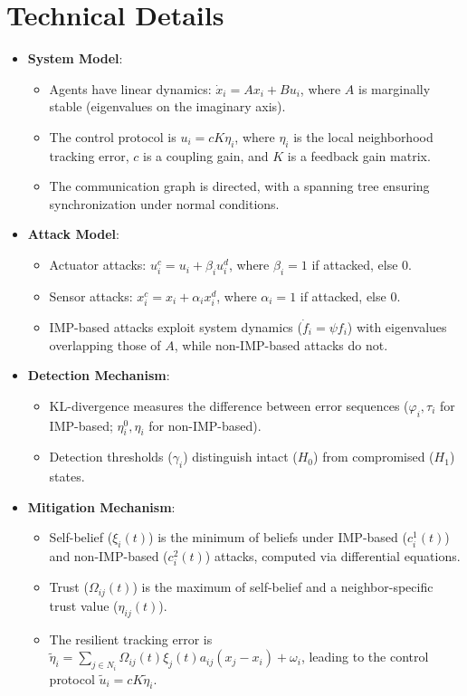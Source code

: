 \documentclass{article}
\begin{document}
\section*{Technical Details}
\begin{itemize}
    \item \textbf{System Model}:
    \begin{itemize}
        \item Agents have linear dynamics: $\dot{x}_i = A x_i + B u_i$, where $A$ is marginally stable (eigenvalues on the imaginary axis).
        \item The control protocol is $u_i = c K \eta_i$, where $\eta_i$ is the local neighborhood tracking error, $c$ is a coupling gain, and $K$ is a feedback gain matrix.
        \item The communication graph is directed, with a spanning tree ensuring synchronization under normal conditions.
    \end{itemize}

    \item \textbf{Attack Model}:
    \begin{itemize}
        \item Actuator attacks: $u_i^c = u_i + \beta_i u_i^d$, where $\beta_i = 1$ if attacked, else 0.
        \item Sensor attacks: $x_i^c = x_i + \alpha_i x_i^d$, where $\alpha_i = 1$ if attacked, else 0.
        \item IMP-based attacks exploit system dynamics ($\dot{f}_i = \psi f_i$) with eigenvalues overlapping those of $A$, while non-IMP-based attacks do not.
    \end{itemize}

    \item \textbf{Detection Mechanism}:
    \begin{itemize}
        \item KL-divergence measures the difference between error sequences ($\varphi_i, \tau_i$ for IMP-based; $\eta_i^0, \eta_i$ for non-IMP-based).
        \item Detection thresholds ($\gamma_i$) distinguish intact ($H_0$) from compromised ($H_1$) states.
    \end{itemize}

    \item \textbf{Mitigation Mechanism}:
    \begin{itemize}
        \item Self-belief ($\xi_i(t)$) is the minimum of beliefs under IMP-based ($c_i^1(t)$) and non-IMP-based ($c_i^2(t)$) attacks, computed via differential equations.
        \item Trust ($\Omega_{ij}(t)$) is the maximum of self-belief and a neighbor-specific trust value ($\eta_{ij}(t)$).
        \item The resilient tracking error is $\tilde{\eta}_i = \sum_{j \in N_i} \Omega_{ij}(t) \xi_j(t) a_{ij} (x_j - x_i) + \omega_i$, leading to the control protocol $\tilde{u}_i = c K \tilde{\eta}_i$.
    \end{itemize}


\end{itemize}
\end{document}
